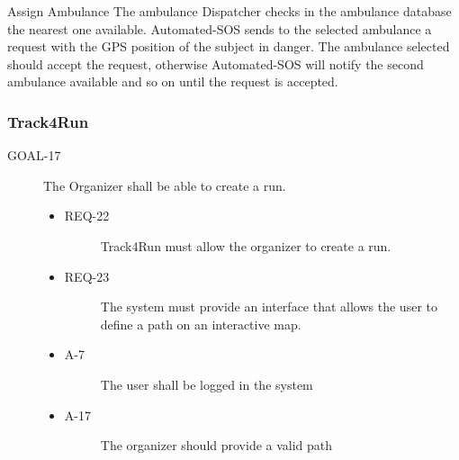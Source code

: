 \documentclass[a4paper]{article}
\newcommand{\requirement}{\ding{229}}%
\begin{document}
        \begin{usecase}{Assign Ambulance}
              {The ambulance Dispatcher checks in the ambulance database the nearest one available.}
              {Automated-SOS sends to the selected ambulance a request with the GPS position of the subject in danger.}
              {The ambulance selected should accept the request, otherwise Automated-SOS will notify the second ambulance available and so on until the request is accepted.}
        \end{usecase}
        
        \subsubsection{Track4Run}
        
         \begin{description}
        	\item[GOAL-17] The Organizer shall be able to create a run.
            	\begin{itemize}
            	    \item[\requirement]
                	\begin{description}
                	\item[REQ-22] Track4Run must allow the organizer to create a run.
                	\end{description}
                	\item[\requirement]
                	\begin{description}
                	\item[REQ-23] The system must provide an interface that allows the user to define a path on an interactive map.
                	\end{description}
                	\item
                	\begin{description}
                	\item[A-7] The user shall be logged in the system         \end{description}
                	\item
                	\begin{description}
                	\item[A-17] The organizer should provide a valid path  
                	\end{description}
                	
                	\end{itemize}
        \end{description}
        
\end{document}

